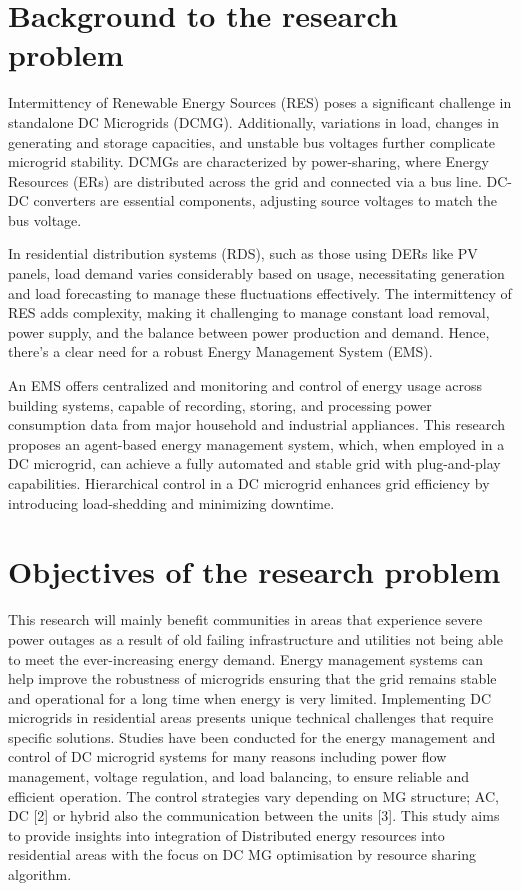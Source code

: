 \section{Background to the research problem}
Intermittency of Renewable Energy Sources (RES) poses a significant challenge in standalone DC Microgrids (DCMG). Additionally, variations in load, changes in generating and storage capacities, and unstable bus voltages further complicate microgrid stability. DCMGs are characterized by power-sharing, where Energy Resources (ERs) are distributed across the grid and connected via a bus line. DC-DC converters are essential components, adjusting source voltages to match the bus voltage.\par

In residential distribution systems (RDS), such as those using DERs like PV panels, load demand varies considerably based on usage, necessitating generation and load forecasting to manage these fluctuations effectively. The intermittency of RES adds complexity, making it challenging to manage constant load removal, power supply, and the balance between power production and demand. Hence, there's a clear need for a robust Energy Management System (EMS).\par

An EMS offers centralized and monitoring and control of energy usage across building systems, capable of recording, storing, and processing power consumption data from major household and industrial appliances. This research proposes an agent-based energy management system, which, when employed in a DC microgrid, can achieve a fully automated and stable grid with plug-and-play capabilities. Hierarchical control in a DC microgrid enhances grid efficiency by introducing load-shedding and minimizing downtime.\par

\section{Objectives of the research problem}
This research will mainly benefit communities in areas that experience severe power outages as a result of old failing infrastructure and utilities not being able to meet the ever-increasing energy demand. Energy management systems can help improve the robustness of microgrids ensuring that the grid remains stable and operational for a long time when energy is very limited.  Implementing DC microgrids in residential areas presents unique technical challenges that require specific solutions. Studies have been conducted for the energy management and control of DC microgrid systems for many reasons including power flow management, voltage regulation, and load balancing, to ensure reliable and efficient operation. The control strategies vary depending on MG structure; AC, DC [2]  or hybrid also the communication between the units [3].  This study aims to provide insights into integration of Distributed energy resources into residential areas with the focus on DC MG optimisation by resource sharing algorithm. 

